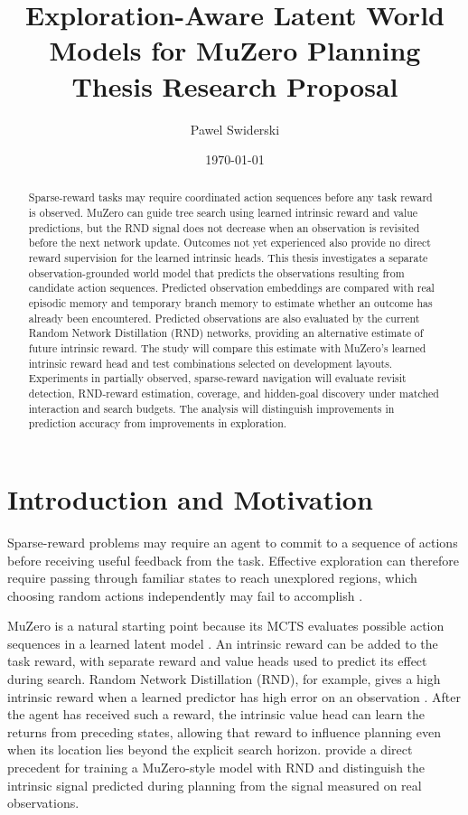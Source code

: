 \documentclass{article}
\title{Exploration-Aware Latent World Models for MuZero Planning\\[0.4em]
\large Thesis Research Proposal}
\author{Pawel Swiderski}
\date{\today}
\begin{document}
\maketitle
{}

\begin{abstract}
Sparse-reward tasks may require coordinated action sequences before any task
reward is observed. MuZero can guide tree search using learned intrinsic reward
and value predictions, but the RND signal does not decrease when an observation
is revisited before the next network update. Outcomes not yet experienced also
provide no direct reward supervision for the learned intrinsic heads.
This thesis investigates a separate observation-grounded world model that
predicts the observations resulting from candidate action sequences. Predicted
observation embeddings are compared with real episodic memory and temporary
branch memory to estimate whether an outcome has already been encountered.
Predicted observations are also evaluated by the current Random Network
Distillation (RND) networks, providing an alternative estimate of future
intrinsic reward. The study will compare this estimate with MuZero's learned
intrinsic reward head and test combinations selected on development layouts.
Experiments in partially observed, sparse-reward navigation will evaluate
revisit detection, RND-reward estimation, coverage, and hidden-goal discovery
under matched interaction and search budgets. The analysis will distinguish
improvements in prediction accuracy from improvements in exploration.
\end{abstract}

\section{Introduction and Motivation}

Sparse-reward problems may require an agent to commit to a sequence of actions
before receiving useful feedback from the task. Effective exploration can
therefore require passing through familiar states to reach unexplored regions,
which choosing random actions independently may fail to accomplish
\citep{bootstrapped-dqn}.

MuZero is a natural starting point because its MCTS evaluates possible action
sequences in a learned latent model \citep{muzero}. An intrinsic reward can be
added to the task reward, with separate reward and value heads used to predict
its effect during search. Random Network Distillation (RND), for example,
gives a high intrinsic reward when a learned predictor has high error on an
observation \citep{rnd}. After the agent has received such a reward, the
intrinsic value head can learn the returns from preceding states, allowing that
reward to influence planning even when its location lies beyond the explicit
search horizon. \citet{walker23} provide a direct precedent for training a
MuZero-style model with RND and distinguish the intrinsic signal predicted
during planning from the signal measured on real observations.
\end{document}

